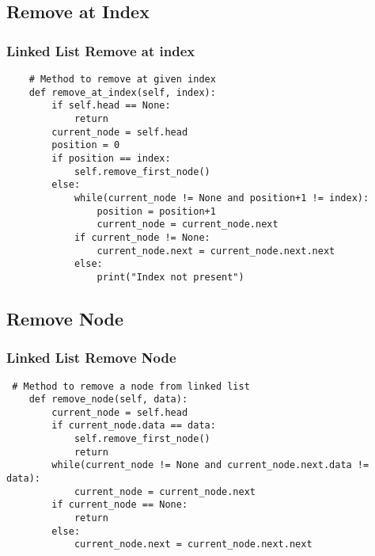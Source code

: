 \documentclass{beamer}
\begin{document}
\begin{frame}[fragile]
\subsection{Remove at Index}
\frametitle{Linked List Remove at index}
\begin{lstlisting}
    # Method to remove at given index
    def remove_at_index(self, index):
        if self.head == None:
            return
        current_node = self.head
        position = 0
        if position == index:
            self.remove_first_node()
        else:
            while(current_node != None and position+1 != index):
                position = position+1
                current_node = current_node.next
            if current_node != None:
                current_node.next = current_node.next.next
            else:
                print("Index not present")
\end{lstlisting}
\end{frame}

\begin{frame}[fragile]
\subsection{Remove Node}
\frametitle{Linked List Remove Node}
\begin{lstlisting}
 # Method to remove a node from linked list
    def remove_node(self, data):
        current_node = self.head
        if current_node.data == data:
            self.remove_first_node()
            return
        while(current_node != None and current_node.next.data != data):
            current_node = current_node.next
        if current_node == None:
            return
        else:
            current_node.next = current_node.next.next
\end{lstlisting}
\end{frame}
\end{document}
